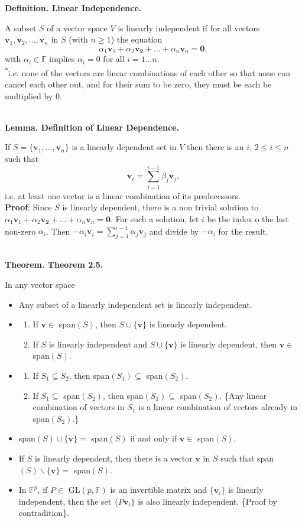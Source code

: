 \documentclass{article}
\newcommand{\vect}[1]{\mathbf{#1}}
\newcommand{\definition}[2]{\textbf{Definition. #1.}\begin{adjustwidth}{1cm}{1cm}#2\end{adjustwidth}}
\newcommand{\theorem}[2]{\textbf{Theorem. #1.}\begin{adjustwidth}{1cm}{1cm}#2\end{adjustwidth}}
\newcommand{\lemma}[2]{\textbf{Lemma. #1.}\begin{adjustwidth}{1cm}{1cm}#2\end{adjustwidth}}
\begin{document}
\definition{Linear Independence}{A subset $S$ of a vector space $V$ is linearly independent if for all vectors $\vect{v}_1, \vect{v}_2, \ldots, \vect{v}_n$ in $S$ (with $n \geq 1$) the equation \[\alpha_1 \vect{v}_1 + \alpha_2 \vect{v_2} + \ldots + \alpha _n \vect{v}_n = \vect{0},\]with $\alpha _i \in \mathbb{F}$ implies $\alpha_i = 0$ for all $i = 1\ldots n$.\\[1\baselineskip]\textsuperscript{*}i.e. none of the vectors are linear combinations of each other so that none can cancel each other out, and for their sum to be zero, they must be each be multiplied by 0.}~\\
\lemma{Definition of Linear Dependence}{If $S = \{ \vect{v}_1, \ldots , \vect{v}_n \}$ is a linearly dependent set in $V$ then there is an $i$, $2 \leq i \leq n$ such that \[ \vect{v}_i = \sum_{j=1}^{i-1} \beta _j \vect{v}_j,\]i.e. at least one vector is a linear combination of its predecessors.\\\textbf{Proof}: Since $S$ is linearly dependent, there is a non trivial solution to $\alpha_1 \vect{v}_1 + \alpha_2 \vect{v_2} + \ldots + \alpha _n \vect{v}_n = \vect{0}$. For such a solution, let $i$ be the index o the last non-zero $\alpha_i$. Then $-\alpha_i \vect{v}_i = \sum_{j=1}^{i-1} \alpha_j \vect{v}_j$ and divide by $- \alpha_i$ for the result.}~\\
\theorem{Theorem 2.5}{In any vector space
\begin{itemize}
  \item Any subset of a linearly independent set is linearly independent.
  \item \begin{enumerate}
    \item If $\vect{v} \in$ span$(S)$, then $S \cup \{ \vect{v} \}$ is linearly dependent.
    \item If $S$ is linearly independent and $S \cup \{ \vect{v} \}$ is linearly dependent, then $\vect{v} \in $ span$(S)$.
  \end{enumerate}
  \item \begin{enumerate}
    \item If $S_1 \subseteq S_2$, then span$(S_1) \subseteq$ span$(S_2)$.
    \item If $S_1 \subseteq$ span$(S_2)$, then span$(S_1) \subseteq$ span$(S_2)$. \{Any linear combination of vectors in $S_1$ is a linear combination of vectors already in span$(S_2)$.\}
  \end{enumerate}
  \item span$(S) \cup \{ \vect{v} \} = $ span$(S)$ if and only if $\vect{v} \in $ span$(S)$.
  \item If $S$ is linearly dependent, then there is a vector $\vect{v}$ in $S$ such that span$(S) \backslash \{ \vect{v} \} = $ span$(S)$.
  \item In $\mathbb{F}^p$, if $P \in$ GL$(p, \mathbb{F})$ is an invertible matrix and $\{ \vect{v}_i \}$ is linearly independent, then the set $\{ P \vect{v}_i \}$ is also linearly independent. \{Proof by contradition\}.
\end{itemize}}~\\
\end{document}
